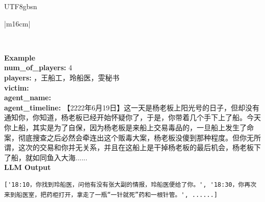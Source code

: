 \documentclass[11pt]{article}
\begin{document}
{\begin{CJK}{UTF8}{gbsn}
\begin{table}[ht!]
\begin{minipage}{\textwidth}
\begin{tabular}{|m{16cm}|}
\begin{minipage}[t]{\linewidth}
\begin{verbatim}
\end{verbatim}
\end{minipage} \\
\hline
{}  \textbf{Example}  \\
 \textbf{  num\_of\_players:} \small4\\
 \textbf{  players:} ，王船工，玲船医，雯秘书\\
  \textbf{  victim:} \\
 \textbf{  agent\_name:} \\
  \textbf{  agent\_timeline:} \small【2222年6月19日】这一天是杨老板上阳光号的日子，但却没有通知你，你知道，杨老板已经开始怀疑你了，于是，你带着几个手下上了船。今天你上船，其实是为了自保，因为杨老板是来船上交易毒品的，一旦船上发生了命案，彻底搜查之后必然会牵连出这个贩毒大案，杨老板没傻到那种程度。但你无所谓，这次的交易和你并无关系，并且在这船上是干掉杨老板的最后机会，杨老板下了船，就如同鱼入大海...... \\

\hline
{}  {\textbf{LLM Output}} \\
 \begin{minipage}[t]{\linewidth}
\small\begin{verbatim}
['18:10，你找到玲船医，问他有没有张大副的情报，玲船医便给了你。', '18:30，你再次来到船医室，把药柜打开，拿走了一瓶“一针就死”药和一根针管。', ......]


\end{verbatim}
\end{minipage}
\end{tabular}
\end{minipage}
\end{table}
\end{CJK}}
\end{document}

